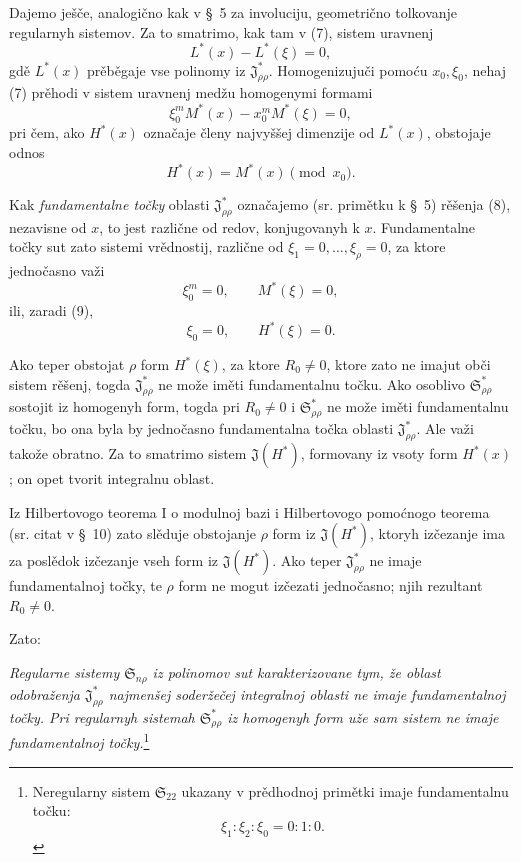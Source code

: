 \documentclass[11pt]{article}
\providecommand{\Ssys}{\mathfrak{S}}
\providecommand{\Jdom}{\mathfrak{J}}
\begin{document}
Dajemo ješče, analogično kak v \S\ 5 za involuciju, geometrično tolkovanje regularnyh sistemov. Za to smatrimo, kak tam v (7), sistem uravnenj
\begin{equation}
  L^*(x)-L^*(\xi)=0,
\tag{7}
\end{equation}
gdě $L^*(x)$ prěběgaje vse polinomy iz $\Jdom^*_{\rho\rho}$. Homogenizujuči pomoću $x_0,\xi_0$, nehaj (7) prěhodi v sistem uravnenj medžu homogenymi formami
\begin{equation}
  \xi_0^{m}M^*(x)-x_0^{m}M^*(\xi)=0,
\tag{8}
\end{equation}
pri čem, ako $H^*(x)$ označaje členy najvyššej dimenzije od $L^*(x)$, obstojaje odnos
\begin{equation}
  H^*(x)=M^*(x)\pmod{x_0}.
\tag{9}
\end{equation}

Kak {\itshape fundamentalne točky} oblasti $\Jdom^*_{\rho\rho}$ označajemo (sr. primětku k \S\ 5) rěšenja (8), nezavisne od $x$, to jest različne od redov, konjugovanyh k $x$. Fundamentalne točky sut zato sistemi vrědnostij, različne od $\xi_1=0,\ldots,\xi_\rho=0$, za ktore jednočasno važi
\[
  \xi_0^m=0,\qquad M^*(\xi)=0,
\]
ili, zaradi (9),
\[
  \xi_0=0,
  \qquad H^*(\xi)=0.
\]

Ako teper obstojat $\rho$ form $H^*(\xi)$, za ktore $R_0\ne0$, ktore zato ne imajut obči sistem rěšenj, togda $\Jdom^*_{\rho\rho}$ ne može iměti fundamentalnu točku. Ako osoblivo $\Ssys^*_{\rho\rho}$ sostojit iz homogenyh form, togda pri $R_0\ne0$ i $\Ssys^*_{\rho\rho}$ ne može iměti fundamentalnu točku, bo ona byla by jednočasno fundamentalna točka oblasti $\Jdom^*_{\rho\rho}$. Ale važi takože obratno. Za to smatrimo sistem $\Jdom(H^*)$, formovany iz vsoty form $H^*(x)$; on opet tvorit integralnu oblast.

Iz Hilbertovogo teorema I o modulnoj bazi i Hilbertovogo pomoćnogo teorema (sr. citat v \S\ 10) zato slěduje obstojanje $\rho$ form iz $\Jdom(H^*)$, ktoryh izčezanje ima za poslědok izčezanje vseh form iz $\Jdom(H^*)$. Ako teper $\Jdom^*_{\rho\rho}$ ne imaje fundamentalnoj točky, te $\rho$ form ne mogut izčezati jednočasno; njih rezultant $R_0\ne0$.

Zato:

{\itshape Regularne sistemy $\Ssys_{n\rho}$ iz polinomov sut karakterizovane tym, že oblast odobraženja $\Jdom^*_{\rho\rho}$ najmenšej soderžečej integralnoj oblasti ne imaje fundamentalnoj točky. Pri regularnyh sistemah $\Ssys^*_{\rho\rho}$ iz homogenyh form uže sam sistem ne imaje fundamentalnoj točky.}\footnote{Neregularny sistem $\Ssys_{22}$ ukazany v prědhodnoj primětki imaje fundamentalnu točku:
\[
  \xi_1:\xi_2:\xi_0=0:1:0.
\]}
\end{document}
